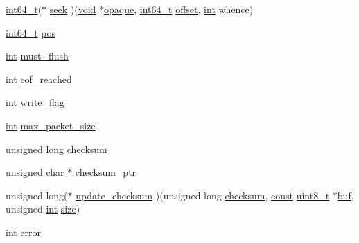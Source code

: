 \begin{DoxyCompactItemize}
\item 
\hyperlink{lib-src_2ffmpeg_2win32_2stdint_8h_a67a9885ef4908cb72ce26d75b694386c}{int64\+\_\+t}($\ast$ \hyperlink{struct_a_v_i_o_context_a4cda0cd632c90d13a546f663287e6cf5}{seek} )(\hyperlink{sound_8c_ae35f5844602719cf66324f4de2a658b3}{void} $\ast$\hyperlink{struct_a_v_i_o_context_afa97c079a10a48588f7b55f9dfff1e47}{opaque}, \hyperlink{lib-src_2ffmpeg_2win32_2stdint_8h_a67a9885ef4908cb72ce26d75b694386c}{int64\+\_\+t} \hyperlink{layer12_8c_a33d71f23ba2052d17f0b754dc35265b0}{offset}, \hyperlink{xmltok_8h_a5a0d4a5641ce434f1d23533f2b2e6653}{int} whence)
\item 
\hyperlink{lib-src_2ffmpeg_2win32_2stdint_8h_a67a9885ef4908cb72ce26d75b694386c}{int64\+\_\+t} \hyperlink{struct_a_v_i_o_context_a7158ec9b44d75704ea5c2fa5ac28fd50}{pos}
\item 
\hyperlink{xmltok_8h_a5a0d4a5641ce434f1d23533f2b2e6653}{int} \hyperlink{struct_a_v_i_o_context_a06e6f0186fcf571355cee82e837dc339}{must\+\_\+flush}
\item 
\hyperlink{xmltok_8h_a5a0d4a5641ce434f1d23533f2b2e6653}{int} \hyperlink{struct_a_v_i_o_context_aa9214f54c01f07076e0a0718b2e9c27b}{eof\+\_\+reached}
\item 
\hyperlink{xmltok_8h_a5a0d4a5641ce434f1d23533f2b2e6653}{int} \hyperlink{struct_a_v_i_o_context_aab6ff8baf51038f1557e817717baccba}{write\+\_\+flag}
\item 
\hyperlink{xmltok_8h_a5a0d4a5641ce434f1d23533f2b2e6653}{int} \hyperlink{struct_a_v_i_o_context_aca19990941933d7573a485851c6b798e}{max\+\_\+packet\+\_\+size}
\item 
unsigned long \hyperlink{struct_a_v_i_o_context_a949cd6dbd89e2d5d59f5c768754004ca}{checksum}
\item 
unsigned char $\ast$ \hyperlink{struct_a_v_i_o_context_a10cbe217c46aeb653d360a9391aff310}{checksum\+\_\+ptr}
\item 
unsigned long($\ast$ \hyperlink{struct_a_v_i_o_context_a7ff26703ccfb39cdd38fd49f5a95796c}{update\+\_\+checksum} )(unsigned long \hyperlink{struct_a_v_i_o_context_a949cd6dbd89e2d5d59f5c768754004ca}{checksum}, \hyperlink{getopt1_8c_a2c212835823e3c54a8ab6d95c652660e}{const} \hyperlink{lib-src_2ffmpeg_2win32_2stdint_8h_a9a941819355e6f658991890ff66b4b0e}{uint8\+\_\+t} $\ast$\hyperlink{xlstr_8c_a781718f5b53a876fe91c424c4607fa8f}{buf}, unsigned \hyperlink{xmltok_8h_a5a0d4a5641ce434f1d23533f2b2e6653}{int} \hyperlink{group__lavu__mem_ga854352f53b148adc24983a58a1866d66}{size})
\item 
\hyperlink{xmltok_8h_a5a0d4a5641ce434f1d23533f2b2e6653}{int} \hyperlink{struct_a_v_i_o_context_afb903b1d9614bfb59e8cc5213de3777b}{error}

\end{DoxyCompactItemize}
